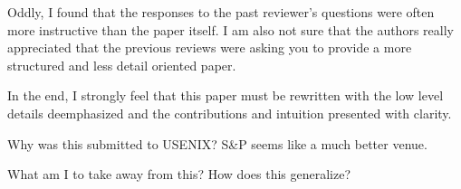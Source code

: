 Oddly, I found that the responses to the past reviewer's questions were often more instructive than the paper itself. I am also not sure that the authors really appreciated that the previous reviews were asking you to provide a more structured and less detail oriented paper.

In the end, I strongly feel that this paper must be rewritten with the low level details deemphasized and the contributions and intuition presented with clarity.

\begin{center}
\end{center}

Why was this submitted to USENIX?  S\&P seems like a much better venue.

What am I to take away from this?  How does this generalize?
